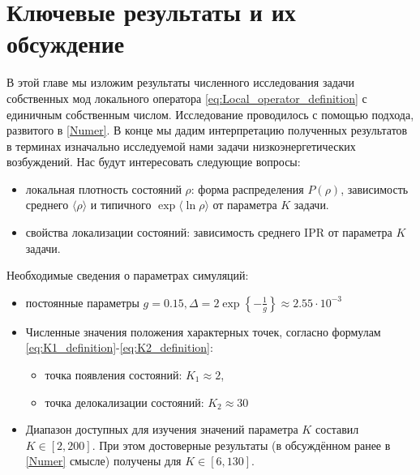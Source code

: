 \chapter{Ключевые результаты и их обсуждение} \label{Result}
В этой главе мы изложим результаты численного исследования задачи собственных мод локального оператора \eqref{eq:Local_operator_definition} с единичным собственным числом. Исследование проводилось с помощью подхода, развитого в \autoref{Numer}. В конце мы дадим интерпретацию полученных результатов в терминах изначально исследуемой нами задачи низкоэнергетических возбуждений. 
Нас будут интересовать следующие вопросы:
\begin{itemize}
	\item локальная плотность состояний $\rho$: форма распределения $P(\rho)$, зависимость среднего $\langle \rho \rangle$ и типичного $\exp \langle \ln \rho \rangle$ от параметра $K$ задачи.
	\item свойства локализации состояний: зависимость среднего IPR от параметра $K$ задачи.
\end{itemize}
Необходимые сведения о параметрах симуляций:
\begin{itemize}
	\item постоянные параметры $g = 0.15, \Delta = 2 \exp \left\{ -\frac{1}{g} \right\} \approx 2.55 \cdot 10^{-3}$
	\item Численные значения положения характерных точек, согласно формулам \eqref{eq:K1_definition}-\eqref{eq:K2_definition}:
	\begin{itemize}
		\item точка появления состояний: $K_1 \approx 2$,
		\item точка делокализации состояний: $K_2 \approx 30$
	\end{itemize}
	\item Диапазон доступных для изучения значений параметра $K$ составил $K \in [2, 200]$. При этом достоверные результаты (в обсуждённом ранее в \autoref{Numer} смысле) получены для $K \in [6, 130]$. 
\end{itemize}



